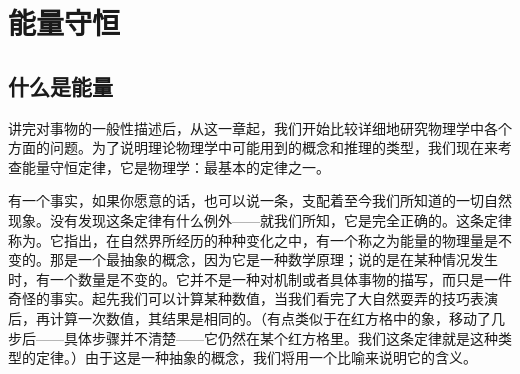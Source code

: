 \chapter{能量守恒}

\section{什么是能量}

讲完对事物的一般性描述后，从这一章起，我们开始比较详细地研究物理学中各个方面的问题。为了说明理论物理学中可能用到的概念和推理的类型，我们现在来考查能量守恒定律，它是物理学：最基本的定律之一。

有一个事实，如果你愿意的话，也可以说一条，支配着至今我们所知道的一切自然现象。没有发现这条定律有什么例外——就我们所知，它是完全正确的。这条定律称为。它指出，在自然界所经历的种种变化之中，有一个称之为能量的物理量是不变的。那是一个最抽象的概念，因为它是一种数学原理；说的是在某种情况发生时，有一个数量是不变的。它并不是一种对机制或者具体事物的描写，而只是一件奇怪的事实。起先我们可以计算某种数值，当我们看完了大自然耍弄的技巧表演后，再计算一次数值，其结果是相同的。（有点类似于在红方格中的象，移动了几步后——具体步骤并不清楚——它仍然在某个红方格里。我们这条定律就是这种类型的定律。）由于这是一种抽象的概念，我们将用一个比喻来说明它的含义。


